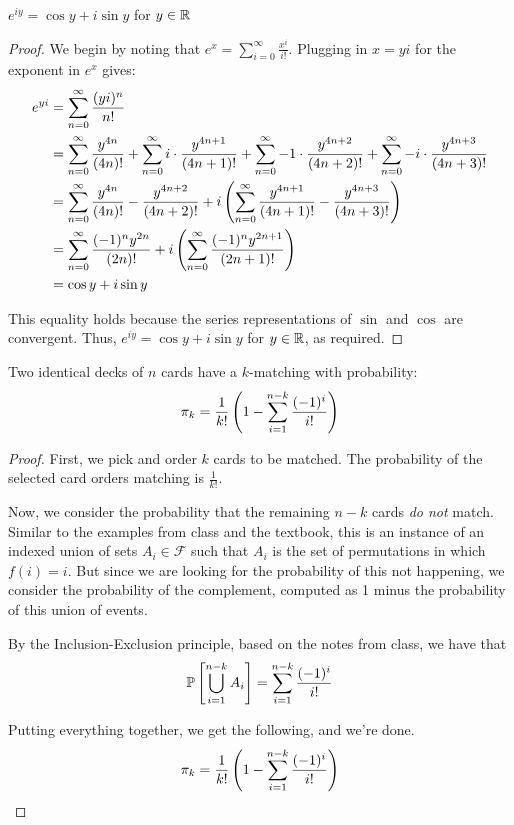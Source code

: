 \documentclass[name=Jacob\ Strieb, andrewid=jstrieb, course=69-420, num=8]{homework}
\begin{document}
\begin{claim}
    $e^{iy} = \cos y + i \sin y$ for $y \in \mathbb{R}$
\end{claim}
\begin{proof}
    We begin by noting that $e^x = \sum_{i = 0}^\infty \frac{x^i}{i!}$. Plugging in $x = yi$ for the exponent in $e^x$ gives:
    \begin{align*}
    e^{yi} &= \sum_{n = 0}^\infty \frac{(yi)^n}{n!} \\
    &= \sum_{n = 0}^\infty \frac{y^{4n}}{(4n)!} + \sum_{n = 0}^\infty i \cdot \frac{y^{4n + 1}}{(4n + 1)!} + \sum_{n = 0}^\infty -1 \cdot \frac{y^{4n + 2}}{(4n + 2)!} + \sum_{n = 0}^\infty -i \cdot \frac{y^{4n + 3}}{(4n + 3)!} \\
    &= \sum_{n = 0}^\infty \frac{y^{4n}}{(4n)!} - \frac{y^{4n + 2}}{(4n + 2)!} + i \left(  \sum_{n = 0}^\infty \frac{y^{4n + 1}}{(4n + 1)!} - \frac{y^{4n + 3}}{(4n + 3)!}  \right) \\
    &= \sum_{n = 0}^\infty \frac{(-1)^n y^{2n}}{(2n)!} + i \left( \sum_{n = 0}^\infty \frac{(-1)^n y^{2n + 1}}{(2n + 1)!} \right) \\
    &= \cos y + i \sin y
    \end{align*} 
    
    This equality holds because the series representations of $\sin$ and $\cos$ are convergent. Thus, $e^{iy} = \cos y + i \sin y$ for $y \in \mathbb{R}$, as required.
\end{proof}
\newpage


\begin{claim}
    Two identical decks of $n$ cards have a $k$-matching with probability:
    $$ \pi_k = \frac1{k!} \left(  1 - \sum_{i = 1}^{n - k} \frac{(-1)^i}{i!}  \right) $$
\end{claim}
\begin{proof}
    First, we pick and order $k$ cards to be matched. The probability of the selected card orders matching is $\frac{1}{k!}$.
    
    Now, we consider the probability that the remaining $n - k$ cards \textit{do not} match. Similar to the examples from class and the textbook, this is an instance of an indexed union of sets $A_i \in \mathcal{F}$ such that $A_i$ is the set of permutations in which $f(i) = i$. But since we are looking for the probability of this not happening, we consider the probability of the complement, computed as 1 minus the probability of this union of events.
    
    By the Inclusion-Exclusion principle, based on the notes from class, we have that
    $$ \mathbb{P}\left[  \bigcup_{i = 1}^{n - k} A_i  \right] = \sum_{i = 1}^{n - k} \frac{(-1)^i}{i!} $$
    
    Putting everything together, we get the following, and we're done.
    $$ \pi_k = \frac1{k!} \left(  1 - \sum_{i = 1}^{n - k} \frac{(-1)^i}{i!}  \right)$$
\end{proof}
\end{document}
